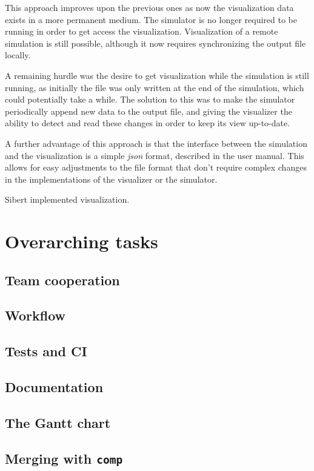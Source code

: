 \documentclass[a4paper,12pt]{article}
\begin{document}
This approach improves upon the previous ones as now the visualization data exists in a more permanent medium. The simulator is no longer required to be running in order to get access the visualization. Visualization of a remote simulation is still possible, although it now requires synchronizing the output file locally.

A remaining hurdle was the desire to get visualization while the simulation is still running, as initially the file was only written at the end of the simulation, which could potentially take a while. The solution to this was to make the simulator periodically append new data to the output file, and giving the visualizer the ability to detect and read these changes in order to keep its view up-to-date.

A further advantage of this approach is that the interface between the simulation and the visualization is a simple \textit{json} format, described in the user manual. This allows for easy adjustments to the file format that don't require complex changes in the implementations of the visualizer or the simulator.

Sibert implemented visualization.

\section{Overarching tasks}
\subsection{Team cooperation} %
\subsection{Workflow} %
\subsection{Tests and CI} %
\subsection{Documentation}
\subsection{The Gantt chart}
\subsection{Merging with \texttt{comp}}

\pagebreak
\printbibliography
\end{document}
